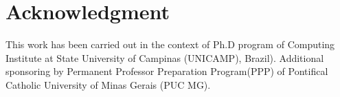 \documentclass[10pt, conference]{IEEEtran}
\begin{document}
\section*{Acknowledgment}
This work has been carried out in the context of Ph.D program of  Computing Institute at State University of Campinas (UNICAMP), Brazil). Additional sponsoring by Permanent Professor Preparation Program(PPP) of Pontifical Catholic University of Minas Gerais (PUC MG). 






%
%





\end{document}
